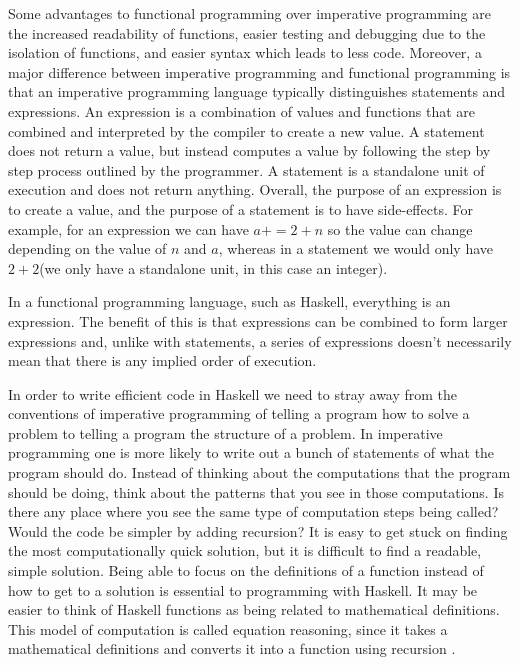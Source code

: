 \documentclass{article}
\begin{document}
\vspace{\baselineskip}
Some advantages to functional programming over imperative programming are the increased readability of functions, easier testing and debugging due to the isolation of functions, and easier syntax which leads to less code. Moreover, a major difference between imperative programming and functional programming is that an imperative programming language typically distinguishes statements and expressions. An expression is a combination of values and functions that are combined and interpreted by the compiler to create a new value. A statement does not return a value, but instead computes a value by following the step by step process outlined by the programmer. A statement is a standalone unit of execution and does not return anything\cite{19}. Overall, the purpose of an expression is to create a value, and the purpose of a statement is to have side-effects. For example, for an expression we can have $a += 2 + n$ so the value can change depending on the value of $n$ and $a$, whereas in a statement we would only have $2+2$(we only have a standalone unit, in this case an integer). 

\vspace{\baselineskip}
In a functional programming language, such as Haskell, everything is an expression. The benefit of this is that expressions can be combined to form larger expressions and, unlike with statements, a series of expressions doesn't necessarily mean that there is any implied order of execution.

\vspace{\baselineskip}
In order to write efficient code in Haskell we need to stray away from the conventions of imperative programming of telling a program how to solve a problem to telling a program the structure of a problem. In imperative programming one is more likely to write out a bunch of statements of what the program should do. Instead of thinking about the computations that the program should be doing, think about the patterns that you see in those computations. Is there any place where you see the same type of computation steps being called? Would the code be simpler by adding recursion? It is easy to get stuck on finding the most computationally quick solution, but it is difficult to find a readable, simple solution. Being able to focus on the definitions of a function instead of how to get to a solution is essential to programming with Haskell. It may be easier to think of Haskell functions as being related to mathematical definitions. This model of computation is called equation reasoning, since it takes a mathematical definitions and converts it into a function using recursion \cite{PL}. 
\end{document}
